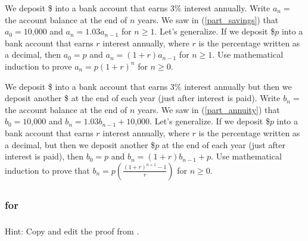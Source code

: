 \begin{exer}[\exerE] %
\label{exer_savings_balance}
    We deposit \$ into a bank account that earns 3\% interest annually. Write $a_n=$ the account balance at the end of $n$ years. We saw in  (\ref{part_savings}) that $a_0=\text{10,000}$ and $a_n=1.03a_{n-1}$ for $n \ge 1$. Let's generalize.  If we deposit \$$p$ into a bank account that earns $r$ interest annually, where $r$ is the percentage written as a decimal, then $a_0=p$ and $a_n=(1+r)a_{n-1}$ for $n \ge 1$.  Use mathematical induction to prove $a_n=p(1+r)^n$ for $n \ge 0$.
\end{exer}

\begin{exer}[\exerE] %
\label{exer_annuity_balance}
    We deposit \$ into a bank account that earns 3\% interest annually but then we deposit another \$ at the end of each year (just after interest is paid).  Write $b_n=$ the account balance at the end of $n$ years.   We saw in  (\ref{part_annuity}) that $b_0=\text{10,000}$ and $b_n = 1.03b_{n-1}+ \text{10,000}$.  Let's generalize.  If we deposit \$$p$ into a bank account that earns $r$ interest annually, where $r$ is the percentage written as a decimal, but then we deposit another \$$p$ at the end of each year (just after interest is paid), then $b_0=p$ and $b_n = (1+r)b_{n-1}+ p$. Use mathematical induction to prove that $b_n = p \displaystyle \left(\frac{(1+r)^{n+1}-1}{r}\right)$ for $n \ge 0$.
\end{exer}

\subsection{\answers}
\subsubsection{\answers for 
 \subpffmathind}

\subsubsection*{ \answers}
Hint: Copy and edit the proof from .

